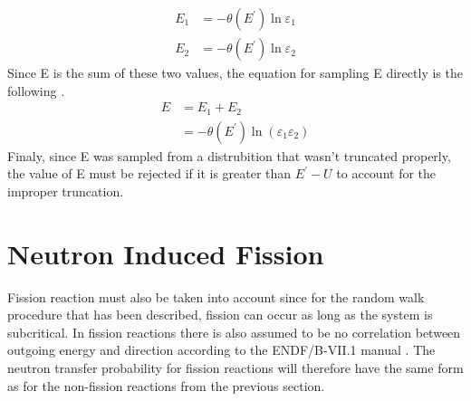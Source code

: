\begin{align}
  E_1 & = -\theta(E^{'})\ln{\varepsilon_1} \\
  E_2 & = -\theta(E^{'})\ln{\varepsilon_2} 
\end{align}
Since E is the sum of these two values, the equation for sampling E directly
is the following \citep{x-5_monte_carlo_team_mcnp_2003}.
\begin{align}
  E & = E_1 + E_2 \nonumber \\
  & = -\theta(E^{'})\ln{(\varepsilon_1\varepsilon_2)}
\end{align}
Finaly, since E was sampled from a distrubition that wasn't truncated properly,
the value of E must be rejected if it is greater than $E^{'}-U$ to account for
the improper truncation.

\section{Neutron Induced Fission}
Fission reaction must also be taken into account since for the random walk
procedure that has been described, fission can occur as long as the system is
subcritical. In fission reactions there is also assumed to be no correlation
between outgoing energy and direction according to the ENDF/B-VII.1 manual
\citep{chadwick_endf/b-vii.1_2011}. The neutron transfer probability for 
fission reactions will therefore have the same form as for the non-fission
reactions from the previous section. 

